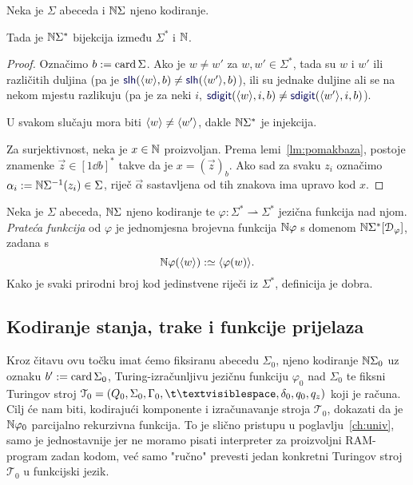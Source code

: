 \begin{propozicija}[{name=[bijektivnost kodiranja riječi]}]\label{pp:bijkr}
Neka je $\Sigma$ abeceda i ${\mathbb N}\Sigma$ njeno kodiranje.

    Tada je ${\mathbb N}\Sigma^*$ bijekcija između $\Sigma^*$ i ${\mathbb N}$.
\end{propozicija}
\begin{proof}
Označimo $b:=\operatorname{card}\Sigma$. Ako je $w\ne w'$ za $w,w'\in\Sigma^*$, tada su $w$ i $w'$ ili različitih duljina (pa je $\f{slh}(\kr w,b)\ne\f{slh}(\kr{w'},b)$), ili su jednake duljine ali se na nekom mjestu razlikuju (pa je za neki $i$, $\f{sdigit}(\kr w,i,b)\ne\f{sdigit}(\kr{w'},i,b)$).

U svakom slučaju mora biti $\langle w\rangle\ne\langle w'\rangle$, dakle ${\mathbb N}\Sigma^*$ je injekcija.

	Za surjektivnost, neka je $x\in{\mathbb N}$ proizvoljan. Prema lemi~\ref{lm:pomakbaza}, postoje znamenke $\vec z\in[1\dd b]^*$ takve da je $x=(\vec z)_b$. Ako sad za svaku $z_i$ označimo $\alpha_i:={\mathbb N}\Sigma^{-1}(z_i)\in\Sigma$, riječ $\vec\alpha$ sastavljena od tih znakova ima upravo kod $x$.
\end{proof}


\begin{definicija}[{name=[prateća funkcija jezične funkcije]}]\label{def:kodfi}
Neka je $\Sigma$ abeceda, ${\mathbb N}\Sigma$ njeno kodiranje te $\varphi:\Sigma^*\rightharpoonup\Sigma^*$ jezična funkcija nad njom. \emph{Prateća funkcija} od $\varphi$ je jednomjesna brojevna funkcija ${\mathbb N}\varphi$ s domenom ${\mathbb N}\Sigma^*[\mathcal D_{\varphi}]$, zadana s
\begin{equation}\label{eq:kodfidef}
    {\mathbb N}\varphi(\langle w\rangle):\simeq\langle\varphi(w)\rangle\text.
\end{equation}
Kako je svaki prirodni broj kod jedinstvene riječi iz $\Sigma^*$, definicija je dobra.
\end{definicija}

\subsection{Kodiranje stanja, trake i funkcije prijelaza}

Kroz čitavu ovu točku imat ćemo fiksiranu abecedu $\Sigma_0$, njeno kodiranje ${\mathbb N}\Sigma_0$ uz oznaku $b':=\operatorname{card}\Sigma_0$, Turing-izračunljivu jezičnu funkciju $\varphi_0$ nad $\Sigma_0$ te fiksni Turingov stroj $\mathcal T_0=(Q_0,\Sigma_0,\Gamma_0,\bl,\delta_0,q_0,q_z)$ koji je računa. Cilj će nam biti, kodirajući komponente i izračunavanje stroja $\mathcal T_0$, dokazati da je ${\mathbb N}\varphi_0$ parcijalno rekurzivna funkcija. To je slično pristupu u poglavlju~\ref{ch:univ}, samo je jednostavnije jer ne moramo pisati interpreter za proizvoljni RAM-program zadan kodom, već samo "ručno" prevesti jedan konkretni Turingov stroj $\mathcal T_0$ u funkcijski jezik.

